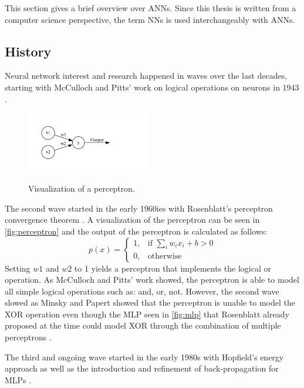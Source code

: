 \documentclass[10pt]{book}
\newcommand{\figureref}[1]{\autoref{#1}}
\begin{document}
This section gives a brief overview over \acp{ANN}. Since this thesis is written from a computer science perspective, the term \acp{NN} is used interchangeably with \acp{ANN}.

\subsection{History}

Neural network interest and research happened in waves over the last decades, starting with McCulloch and Pitts' work on logical operations on neurons in 1943 \cite{mcculloch1943logical,485891}. 

\begin{figure}
  \caption{Visualization of a perceptron.}
  \includegraphics[width=0.48\textwidth]{graph/rosenblatt}
  \label{fig:perceptron}
\end{figure}

The second wave started in the early 1960ies with Rosenblatt's perceptron convergence theorem \cite{rosenblatt1962principles}. A visualization of the perceptron can be seen in \figureref{fig:perceptron} and the output of the perceptron is calculated as follows:
\[
    p(x)= 
\begin{cases}
    1, & \text{if } \sum_i w_ix_i + b > 0\\
    0, & \text{otherwise}
\end{cases}
\]
Setting $w1$ and $w2$ to 1 yields a perceptron that implements the logical or operation. As McCulloch and Pitts' work showed, the perceptron is able to model all simple logical operations such as: and, or, not. However, the second wave slowed as Minsky and Papert showed that the perceptron is unable to model the XOR operation \cite{minsky1969perceptron} even though the \ac{MLP} seen in \figureref{fig:mlp} that Rosenblatt already proposed at the time could model XOR through the combination of multiple perceptrons \cite{schmidhuber2022annotated}.

The third and ongoing wave started in the early 1980s with Hopfield's energy approach \cite{hopfield1982neural} as well as the introduction and refinement of back-propagation for \acp{MLP} \cite{werbos1974beyond,rumelhart1986parallel}.
\end{document}
